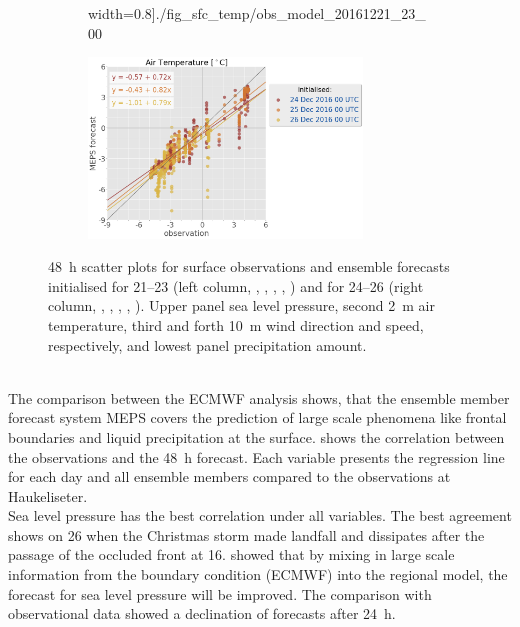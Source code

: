 \begin{figure}
\begin{subfigure}[b]{0.49\textwidth}
    width=0.8\textwidth]{./fig_sfc_temp/obs_model_20161221_23_00}
     \end{subfigure}
     \begin{subfigure}[b]{0.49\textwidth}
     	\centering
     	\includegraphics[trim={25.cm 15.5cm 0cm 3.6cm},clip,
    width=0.8\textwidth]{./fig_sfc_temp/obs_model_20161224_26_00}
     \end{subfigure}
     \caption{\SI{48}{\hour} scatter plots for surface observations and ensemble forecasts initialised for \SIrange{21}{23}{\dec} (left column, \protect{}, \protect{}, \protect{}, \protect{}, \protect{}) and  for \SIrange{24}{26}{\dec} (right column, \protect{}, \protect{}, \protect{}, \protect{}, \protect{}). Upper panel sea level pressure, second \SI{2}{\metre} air temperature, third and forth \SI{10}{\metre} wind direction and speed, respectively, and lowest panel precipitation amount.}\label{fig:scat:obs_meps}
\end{figure}
\\
The comparison between the ECMWF analysis shows, that the ensemble member forecast system MEPS covers the prediction of large scale phenomena like frontal boundaries and liquid precipitation at the surface.  shows the correlation between the observations and the \SI{48}{\hour} forecast. Each variable presents the regression line  for each day and all ensemble members compared to the observations at Haukeliseter.
\\
Sea level pressure has the best correlation under all variables. The best agreement shows on \SI{26}{\dec} when the Christmas storm made landfall and dissipates after the passage of the occluded front at \SI{16}{\UTC}. \cite{dahlgren_comparison_2013} showed that by mixing in large scale information from the boundary condition (ECMWF) into the regional model, the forecast for sea level pressure will be improved. The comparison with observational data showed a declination of forecasts after \SI{24}{\hour}. 
